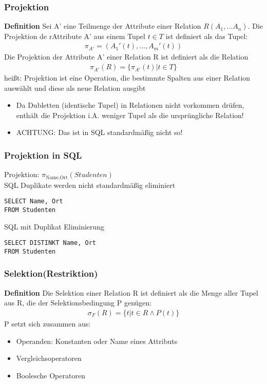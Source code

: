 \subsubsection{Projektion}
\textbf{Definition } Sei A' eine Teilmenge der Attribute einer Relation \(R(A_1, ... A_n)\). Die Projektion de rAttribute A' aus einem Tupel \(t\in T\) ist definiert als das Tupel:
\begin{align*}
	\pi_{A'} = (A_1'(t), \ldots , A_m'(t))
\end{align*}
Die Projektion der Attribute A' einer Relation R ist definiert als die Relation
\begin{align*}
	\pi_{A'}(R) = \{\pi_{A'}(t)|t\in T\}
\end{align*}
heißt: Projektion ist eine Operation, die bestimmte Spalten aus einer Relation auswählt und diese als neue Relation ausgibt
\begin{itemize}
	\item Da Dubletten (identische Tupel) in Relationen nicht vorkommen drüfen, enthält die Projektion i.A. weniger Tupel als die ursprüngliche Relation!
	\item ACHTUNG: Das ist in SQL standardmäßig nicht so!
\end{itemize}
\subsubsection{Projektion in SQL}
Projektion: \(\pi_{\text{Name,Ort}}(Studenten)\)\\
SQL Duplikate werden nicht standardmäßig eliminiert
\begin{lstlisting}
SELECT Name, Ort
FROM Studenten
\end{lstlisting}
SQL mit Duplikat Eliminierung
\begin{lstlisting}
SELECT DISTINKT Name, Ort
FROM Studenten
\end{lstlisting}
\subsubsection{Selektion(Restriktion)}
\textbf{Definition} Die Selektion einer Relation R ist definiert als die Menge aller Tupel aus R, die der Selektionsbedingung P genügen:
\begin{align*}
\sigma_F(R) = \{t|t\in R\wedge P(t)\}
\end{align*}
P setzt sich zusammen aus:
\begin{itemize}
	\item Operanden: Konstanten oder Name eines Attributs
	\item Vergleichsoperatoren
	\item Boolesche Operatoren
\end{itemize}
